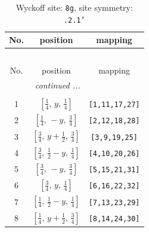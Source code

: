 \documentclass[fleqn,8pt]{jsarticle}
\begin{document}
\renewcommand{\arraystretch}{1.2}
\begin{longtable}{ccc}
\caption{Wyckoff site: {\tt 8g}, site symmetry: {\tt .2.1'}}
 \\
 \hline \hline
No. & position & mapping \\ \hline \endfirsthead

\multicolumn{2}{l}{\tablename\ \thetable{}} \\
 \hline \hline
No. & position & mapping \\ \hline \endhead

 \hline \hline
\multicolumn{2}{r}{\footnotesize\it continued ...} \\ \endfoot

 \hline \hline
\multicolumn{2}{r}{} \\ \endlastfoot

1 & $\left[ \frac{1}{4},\, y,\, \frac{1}{4} \right]$ & {\tt [1,11,17,27]} \\ \hline
2 & $\left[ \frac{1}{4},\, - y,\, \frac{3}{4} \right]$ & {\tt [2,12,18,28]} \\ \hline
3 & $\left[ \frac{3}{4},\, y + \frac{1}{2},\, \frac{3}{4} \right]$ & {\tt [3,9,19,25]} \\ \hline
4 & $\left[ \frac{3}{4},\, \frac{1}{2} - y,\, \frac{1}{4} \right]$ & {\tt [4,10,20,26]} \\ \hline
5 & $\left[ \frac{3}{4},\, - y,\, \frac{3}{4} \right]$ & {\tt [5,15,21,31]} \\ \hline
6 & $\left[ \frac{3}{4},\, y,\, \frac{1}{4} \right]$ & {\tt [6,16,22,32]} \\ \hline
7 & $\left[ \frac{1}{4},\, \frac{1}{2} - y,\, \frac{1}{4} \right]$ & {\tt [7,13,23,29]} \\ \hline
8 & $\left[ \frac{1}{4},\, y + \frac{1}{2},\, \frac{3}{4} \right]$ & {\tt [8,14,24,30]} \\
\end{longtable}
\renewcommand{\arraystretch}{1.2}
\end{document}
